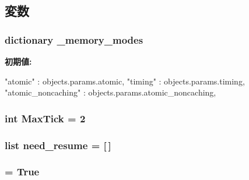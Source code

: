 \subsection{変数}
\hypertarget{namespacem5_1_1simulate_ab4c814bc9719fb6019f8b1ddc4e3bf81}{
\subsubsection[{\_\-memory\_\-modes}]{\setlength{\rightskip}{0pt plus 5cm}dictionary {\bf \_\-memory\_\-modes}}}
\label{namespacem5_1_1simulate_ab4c814bc9719fb6019f8b1ddc4e3bf81}
{\bfseries 初期値:}
\begin{DoxyCode}
{
    "atomic" : objects.params.atomic,
    "timing" : objects.params.timing,
    "atomic_noncaching" : objects.params.atomic_noncaching,
    }
\end{DoxyCode}
\hypertarget{namespacem5_1_1simulate_a2c372e2e14aee3b7fbcfbd49210559d7}{
\subsubsection[{MaxTick}]{\setlength{\rightskip}{0pt plus 5cm}int {\bf MaxTick} = 2}}
\label{namespacem5_1_1simulate_a2c372e2e14aee3b7fbcfbd49210559d7}
\hypertarget{namespacem5_1_1simulate_a032ac35775aee51d7a28909bc144b1ed}{
\subsubsection[{need\_\-resume}]{\setlength{\rightskip}{0pt plus 5cm}list {\bf need\_\-resume} = \mbox{[}$\,$\mbox{]}}}
\label{namespacem5_1_1simulate_a032ac35775aee51d7a28909bc144b1ed}
\hypertarget{namespacem5_1_1simulate_a0e9c92fcadba6c1848a6cacce579e3b8}{
\subsubsection[{need\_\-startup}]{ = True}}
\label{namespacem5_1_1simulate_a0e9c92fcadba6c1848a6cacce579e3b8}
